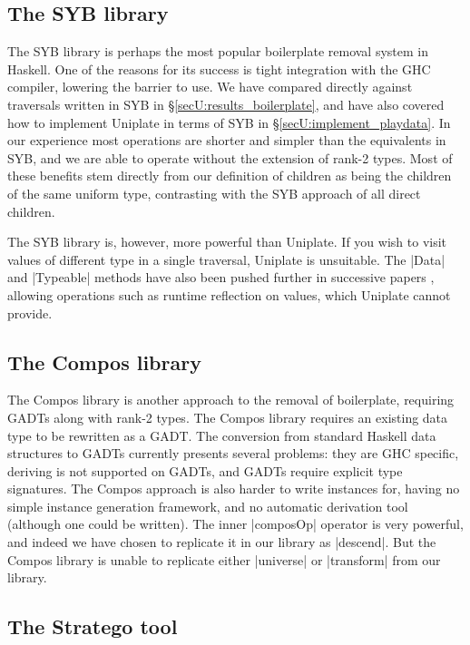 \subsection{The SYB library}

The SYB library \citep{lammel:syb} is perhaps the most popular boilerplate removal system in Haskell. One of the reasons for its success is tight integration with the GHC compiler, lowering the barrier to use. We have compared directly against traversals written in SYB in \S\ref{secU:results_boilerplate}, and have also covered how to implement Uniplate in terms of SYB in \S\ref{secU:implement_playdata}. In our experience most operations are shorter and simpler than the equivalents in SYB, and we are able to operate without the extension of rank-2 types. Most of these benefits stem directly from our definition of children as being the children of the same uniform type, contrasting with the SYB approach of all direct children.

The SYB library is, however, more powerful than Uniplate. If you wish to visit values of different type in a single traversal, Uniplate is unsuitable. The |Data| and |Typeable| methods have also been pushed further in successive papers \citep{lammel:syb2,lammel:syb3}, allowing operations such as runtime reflection on values, which Uniplate cannot provide.

\subsection{The Compos library}

The Compos library \citep{bringert:compos} is another approach to the removal of boilerplate, requiring GADTs \citep{spj:gadt} along with rank-2 types. The Compos library requires an existing data type to be rewritten as a GADT. The conversion from standard Haskell data structures to GADTs currently presents several problems: they are GHC specific, deriving is not supported on GADTs, and GADTs require explicit type signatures. The Compos approach is also harder to write instances for, having no simple instance generation framework, and no automatic derivation tool (although one could be written). The inner |composOp| operator is very powerful, and indeed we have chosen to replicate it in our library as |descend|. But the Compos library is unable to replicate either |universe| or |transform| from our library.

\subsection{The Stratego tool}


